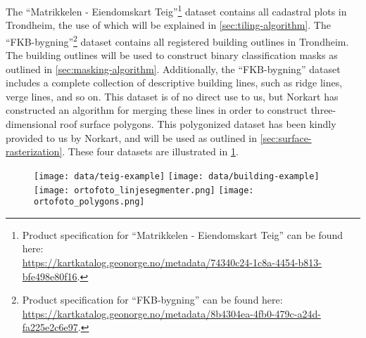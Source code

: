The \enquote{Matrikkelen - Eiendomskart Teig}\footnote{Product specification for \enquote{Matrikkelen - Eiendomskart Teig} can be found here:\\\url{https://kartkatalog.geonorge.no/metadata/74340c24-1c8a-4454-b813-bfe498e80f16}.} dataset contains all cadastral plots in Trondheim, the use of which will be explained in \cref{sec:tiling-algorithm}.
The \enquote{FKB-bygning}\footnote{Product specification for \enquote{FKB-bygning} can be found here:\\\url{https://kartkatalog.geonorge.no/metadata/8b4304ea-4fb0-479c-a24d-fa225e2c6e97}.} dataset contains all registered building outlines in Trondheim.
The building outlines will be used to construct binary classification masks as outlined in \cref{sec:masking-algorithm}.
Additionally, the \enquote{FKB-bygning} dataset includes a complete collection of descriptive building lines, such as ridge lines, verge lines, and so on.
This dataset is of no direct use to us, but Norkart has constructed an algorithm for merging these lines in order to construct three-dimensional roof surface polygons.
This polygonized dataset has been kindly provided to us by Norkart, and will be used as outlined in \cref{sec:surface-rasterization}.
These four datasets are illustrated in \cref{fig:vector-data-example}.

\begin{figure}[H]
  \texttt{[image: data/teig-example]}
  \texttt{[image: data/building-example]}
  \vspace{5em}
  \texttt{[image: ortofoto\_linjesegmenter.png]}
  \texttt{[image: ortofoto\_polygons.png]}
  \label{fig:vector-data-example}
\end{figure}
